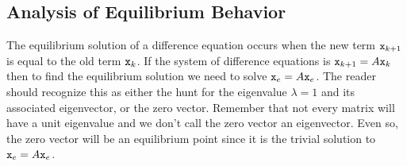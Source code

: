 \subsection{Analysis of Equilibrium Behavior}
The equilibrium solution of a difference equation occurs when the new term $\texttt{x}_{k+1}$ is
equal to the old term $\texttt{x}_k$.  If the system of difference equations is $\texttt{x}_{k+1} = A
\texttt{x}_{k}$ then to find the equilibrium solution we need to solve $\texttt{x}_{e} = A \texttt{x}_e$.  The
reader should recognize this as either the hunt for the eigenvalue $\lambda=1$ and its
associated eigenvector, or the zero vector.  Remember that not every matrix will have a
unit eigenvalue and we don't call the zero vector an eigenvector.  Even so, the zero
vector will be an equilibrium point since it is the trivial solution to $\texttt{x}_e = A \texttt{x}_e$.

% 
%         
% 

